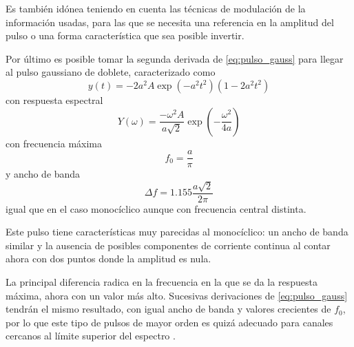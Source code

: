 Es también idónea teniendo en cuenta las técnicas de modulación de la información usadas, para las que se necesita una referencia en la amplitud del pulso o una forma característica que sea posible invertir.

Por último es posible tomar la segunda derivada de \eqref{eq:pulso_gauss} para llegar al pulso gaussiano de doblete, caracterizado como
\begin{equation}
    y(t) = -2 a^2 A\exp(-a^2 t^2)(1 - 2a^2 t^2)
\end{equation}
con respuesta espectral
\begin{equation}
    Y(\omega) = \frac{-\omega^2 A}{a\sqrt{2}}\exp(-\frac{\omega^2}{4a})
\end{equation}
con frecuencia máxima
\begin{equation}
    f_0 = \frac{a}{\pi}
\end{equation}
y ancho de banda
\begin{equation}
    \Delta f = 1.155\frac{a\sqrt{2}}{2\pi}
\end{equation}
igual que en el caso monocíclico aunque con frecuencia central distinta.

Este pulso tiene características muy parecidas al monocíclico: un ancho de banda similar y la ausencia de posibles componentes de corriente continua al contar ahora con dos puntos donde la amplitud es nula.

La principal diferencia radica en la frecuencia en la que se da la respuesta máxima, ahora con un valor más alto.
Sucesivas derivaciones de \eqref{eq:pulso_gauss} tendrán el mismo resultado, con igual ancho de banda y valores crecientes de $f_0$, por lo que este tipo de pulsos de mayor orden es quizá adecuado para canales cercanos al límite superior del espectro \cite{design}.

